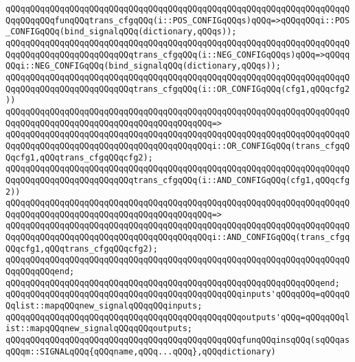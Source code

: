 \newline
\verb|qQQqqQQqqQQqqQQqqQQqqQQqqQQqqQQqqQQqqQQqqQQqqQQqqQQqqQQqqQQqqQQqqQQqqQQqqQQqqQQqfunqQQqtrans_cfgqQQq(i::POS_CONFIGqQQqs)qQQq=>qQQqqQQqi::POS_CONFIGqQQq(bind_signalqQQq(dictionary,qQQqs));|\newline
\verb|qQQqqQQqqQQqqQQqqQQqqQQqqQQqqQQqqQQqqQQqqQQqqQQqqQQqqQQqqQQqqQQqqQQqqQQqqQQqqQQqqQQqqQQqqQQqqQQqtrans_cfgqQQq(i::NEG_CONFIGqQQqs)qQQq=>qQQqqQQqi::NEG_CONFIGqQQq(bind_signalqQQq(dictionary,qQQqs));|\newline
\newline
\verb|qQQqqQQqqQQqqQQqqQQqqQQqqQQqqQQqqQQqqQQqqQQqqQQqqQQqqQQqqQQqqQQqqQQqqQQqqQQqqQQqqQQqqQQqqQQqqQQqtrans_cfgqQQq(i::OR_CONFIGqQQq(cfg1,qQQqcfg2))|\newline
\verb|qQQqqQQqqQQqqQQqqQQqqQQqqQQqqQQqqQQqqQQqqQQqqQQqqQQqqQQqqQQqqQQqqQQqqQQqqQQqqQQqqQQqqQQqqQQqqQQqqQQqqQQqqQQqqQQq=>|\newline
\verb|qQQqqQQqqQQqqQQqqQQqqQQqqQQqqQQqqQQqqQQqqQQqqQQqqQQqqQQqqQQqqQQqqQQqqQQqqQQqqQQqqQQqqQQqqQQqqQQqqQQqqQQqqQQqqQQqi::OR_CONFIGqQQq(trans_cfgqQQqcfg1,qQQqtrans_cfgqQQqcfg2);|\newline
\newline
\verb|qQQqqQQqqQQqqQQqqQQqqQQqqQQqqQQqqQQqqQQqqQQqqQQqqQQqqQQqqQQqqQQqqQQqqQQqqQQqqQQqqQQqqQQqqQQqqQQqtrans_cfgqQQq(i::AND_CONFIGqQQq(cfg1,qQQqcfg2))|\newline
\verb|qQQqqQQqqQQqqQQqqQQqqQQqqQQqqQQqqQQqqQQqqQQqqQQqqQQqqQQqqQQqqQQqqQQqqQQqqQQqqQQqqQQqqQQqqQQqqQQqqQQqqQQqqQQqqQQq=>|\newline
\verb|qQQqqQQqqQQqqQQqqQQqqQQqqQQqqQQqqQQqqQQqqQQqqQQqqQQqqQQqqQQqqQQqqQQqqQQqqQQqqQQqqQQqqQQqqQQqqQQqqQQqqQQqqQQqqQQqi::AND_CONFIGqQQq(trans_cfgqQQqcfg1,qQQqtrans_cfgqQQqcfg2);|\newline
\verb|qQQqqQQqqQQqqQQqqQQqqQQqqQQqqQQqqQQqqQQqqQQqqQQqqQQqqQQqqQQqqQQqqQQqqQQqqQQqqQQqend;|\newline
\verb|qQQqqQQqqQQqqQQqqQQqqQQqqQQqqQQqqQQqqQQqqQQqqQQqqQQqqQQqqQQqqQQqend;|\newline
\newline
\verb|qQQqqQQqqQQqqQQqqQQqqQQqqQQqqQQqqQQqqQQqqQQqqQQqinputs'qQQqqQQq=qQQqqQQqlist::mapqQQqnew_signalqQQqqQQqinputs;|\newline
\verb|qQQqqQQqqQQqqQQqqQQqqQQqqQQqqQQqqQQqqQQqqQQqqQQqoutputs'qQQq=qQQqqQQqlist::mapqQQqnew_signalqQQqqQQqoutputs;|\newline
\newline
\verb|qQQqqQQqqQQqqQQqqQQqqQQqqQQqqQQqqQQqqQQqqQQqqQQqfunqQQqinsqQQq(sqQQqasqQQqm::SIGNALqQQq{qQQqname,qQQq...qQQq},qQQqdictionary)|\newline
